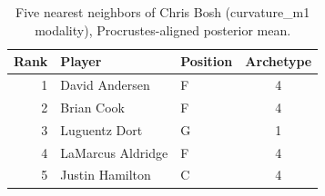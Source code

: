 \begin{table}[htbp]
  \centering\small
  \begin{tabular}{rllc}
    \toprule
    Rank & Player & Position & Archetype \\
    \midrule
    1 & David Andersen & F & 4 \\
    2 & Brian Cook & F & 4 \\
    3 & Luguentz Dort & G & 1 \\
    4 & LaMarcus Aldridge & F & 4 \\
    5 & Justin Hamilton & C & 4 \\
    \bottomrule
  \end{tabular}
  \caption{Five nearest neighbors of Chris Bosh (curvature_m1 modality), Procrustes-aligned posterior mean.}
  \label{tab:Chris_Bosh_neighbors_curvature_m1}
\end{table}

